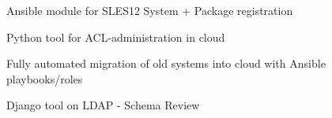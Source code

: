 \documentclass[10pt,A4]{article}
\newcommand{\cvlist}[1] {
	\begin{itemize}{#1}\end{itemize}
}
\begin{document}
\begin{paracol}{2}
\begin{rightcolumn}
{{			%
		}}
		{\cvlist{
			\item{Ansible module for SLES12 System + Package registration}%
			\item{Python tool for ACL-administration in cloud}%
			\item{Fully automated migration of old systems into cloud with Ansible playbooks/roles}%
			\item{Django tool on LDAP - Schema Review}%
		}}


\end{rightcolumn}
\end{paracol}
\end{document}
